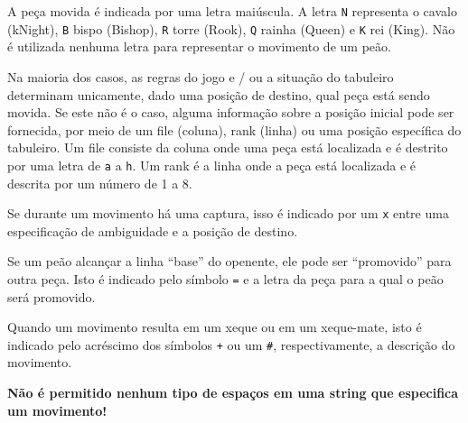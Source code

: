 \documentclass[11pt,a4paper]{article}
\begin{document}
A pe\c{c}a movida \'e indicada por uma letra mai\'uscula. A letra \texttt{N}
representa o cavalo (kNight), \texttt{B} bispo (Bishop), 
\texttt{R} torre (Rook), \texttt{Q} rainha (Queen) e \texttt{K} rei (King).
N\~ao \'e utilizada nenhuma letra para representar o movimento de um pe\~ao.

Na maioria dos casos, as regras do jogo e / ou a situa\c{c}\~ao do tabuleiro 
determinam unicamente, dado uma posi\c{c}\~ao de destino, qual pe\c{c}a est\'a
sendo movida. Se este n\~ao \'e o caso, alguma informa\c{c}\~ao sobre a posi\c{c}\~ao
inicial pode ser fornecida, por meio de um file (coluna), rank (linha) ou uma 
posi\c{c}\~ao espec\'ifica do tabuleiro. Um file consiste da coluna onde uma pe\c{c}a
est\'a localizada e \'e destrito por uma letra de \texttt{a} a \texttt{h}. Um rank
\'e a linha onde a pe\c{c}a est\'a localizada e \'e descrita por um n\'umero de 1 a 8. 

Se durante um movimento h\'a uma captura, isso \'e indicado por um \texttt{x} entre
uma especifica\c{c}\~ao de ambiguidade e a posi\c{c}\~ao de destino.

Se um pe\~ao alcan\c{c}ar a linha ``base'' do openente, ele pode ser ``promovido'' para
outra pe\c{c}a. Isto \'e indicado pelo s\'imbolo \texttt{=} e a letra da pe\c{c}a para a
qual o pe\~ao ser\'a promovido.

Quando um movimento resulta em um xeque ou em um xeque-mate, isto \'e indicado pelo 
acr\'escimo dos s\'imbolos \texttt{+} ou um \texttt{\#}, respectivamente, a descri\c{c}\~ao
do movimento.

\textbf{N\~ao \'e permitido nenhum tipo de espa\c{c}os em uma string que especifica um movimento!}
\end{document}

